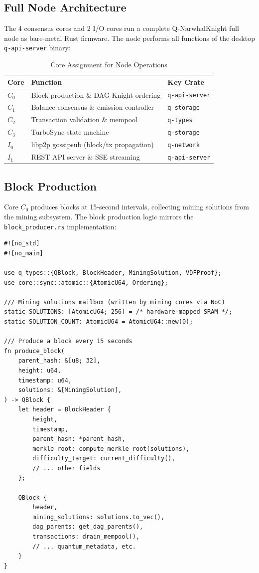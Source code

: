 \documentclass[11pt,a4paper]{article}
\begin{document}
\subsection{Full Node Architecture}

The 4 consensus cores and 2 I/O cores run a complete Q-NarwhalKnight full node as bare-metal Rust firmware. The node performs all functions of the desktop \texttt{q-api-server} binary:

\begin{table}[H]
\centering
\caption{Core Assignment for Node Operations}
\begin{tabular}{@{}lll@{}}
\toprule
\textbf{Core} & \textbf{Function} & \textbf{Key Crate} \\
\midrule
$C_0$ & Block production \& DAG-Knight ordering & \texttt{q-api-server} \\
$C_1$ & Balance consensus \& emission controller & \texttt{q-storage} \\
$C_2$ & Transaction validation \& mempool & \texttt{q-types} \\
$C_3$ & TurboSync state machine & \texttt{q-storage} \\
$I_0$ & libp2p gossipsub (block/tx propagation) & \texttt{q-network} \\
$I_1$ & REST API server \& SSE streaming & \texttt{q-api-server} \\
\bottomrule
\end{tabular}
\end{table}

\subsection{Block Production}

Core $C_0$ produces blocks at 15-second intervals, collecting mining solutions from the mining subsystem. The block production logic mirrors the \texttt{block\_producer.rs} implementation:

\begin{lstlisting}[style=rust,caption={Block Production on QUG-V1 (bare-metal Rust, \texttt{\#![no\_std]})}]
#![no_std]
#![no_main]

use q_types::{QBlock, BlockHeader, MiningSolution, VDFProof};
use core::sync::atomic::{AtomicU64, Ordering};

/// Mining solutions mailbox (written by mining cores via NoC)
static SOLUTIONS: [AtomicU64; 256] = /* hardware-mapped SRAM */;
static SOLUTION_COUNT: AtomicU64 = AtomicU64::new(0);

/// Produce a block every 15 seconds
fn produce_block(
    parent_hash: &[u8; 32],
    height: u64,
    timestamp: u64,
    solutions: &[MiningSolution],
) -> QBlock {
    let header = BlockHeader {
        height,
        timestamp,
        parent_hash: *parent_hash,
        merkle_root: compute_merkle_root(solutions),
        difficulty_target: current_difficulty(),
        // ... other fields
    };

    QBlock {
        header,
        mining_solutions: solutions.to_vec(),
        dag_parents: get_dag_parents(),
        transactions: drain_mempool(),
        // ... quantum_metadata, etc.
    }
}
\end{lstlisting}
\end{document}
